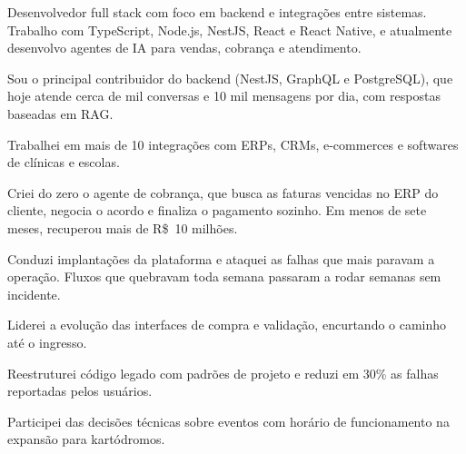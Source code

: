 \documentclass{resume}
\begin{document}


Desenvolvedor full stack com foco em backend e integrações entre sistemas. Trabalho com TypeScript, Node.js, NestJS, React e React Native, e atualmente desenvolvo agentes de IA para vendas, cobrança e atendimento.


\begin{bullets}
  \item Sou o principal contribuidor do backend (NestJS, GraphQL e PostgreSQL), que hoje atende cerca de mil conversas e 10 mil mensagens por dia, com respostas baseadas em RAG.
  \item Trabalhei em mais de 10 integrações com ERPs, CRMs, e-commerces e softwares de clínicas e escolas.
  \item Criei do zero o agente de cobrança, que busca as faturas vencidas no ERP do cliente, negocia o acordo e finaliza o pagamento sozinho. Em menos de sete meses, recuperou mais de R\$~10 milhões.
  \item Conduzi implantações da plataforma e ataquei as falhas que mais paravam a operação. Fluxos que quebravam toda semana passaram a rodar semanas sem incidente.
\end{bullets}

\begin{bullets}
  \item Liderei a evolução das interfaces de compra e validação, encurtando o caminho até o ingresso.
  \item Reestruturei código legado com padrões de projeto e reduzi em 30\% as falhas reportadas pelos usuários.
  \item Participei das decisões técnicas sobre eventos com horário de funcionamento na expansão para kartódromos.
\end{bullets}
\end{document}
